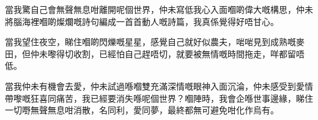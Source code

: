 當我驚自己會無聲無息咁離開呢個世界，仲未寫低我心入面嗰啲偉大嘅構思，仲未將腦海裡嗰啲燦爛嘅詩句編成一首首動人嘅詩篇，我真係覺得好唔甘心。

當我望住夜空，睇住嗰啲閃爍嘅星星，感覺自己就好似農夫，啱啱見到成熟嘅麥田，但仲未嚟得切收割，已經怕自己趕唔切，就要被無情嘅時間拖走，咩都留唔低。

當我仲未有機會去愛，仲未試過喺嗰雙充滿深情嘅眼神入面沉淪，仲未感受到愛情帶嚟嘅狂喜同痛苦，我已經要消失喺呢個世界？嗰陣時，我會企喺世事邊緣，睇住一切嘢無聲無息咁消散，名同利，愛同夢，最終都無可避免咁化作烏有。